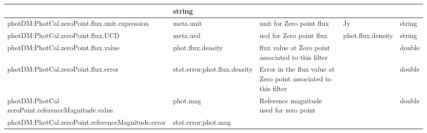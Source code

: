 \documentclass[11pt,a4paper]{ivoa}
\begin{document}
\begin{appendices}
\begin{table}[H]
\begin{adjustbox}{angle=90}
\begin{tabular}{p{3in}p{0.87in}p{2in}p{1in}p{0.25in}}
\multicolumn{1}{p{1in}}{} &
\multicolumn{1}{p{0.25in}}{{\fontsize{8pt}{8pt}\selectfont string}} \\
\hline
\multicolumn{1}{p{3in}}{{\fontsize{8pt}{8pt}
\selectfont photDM:PhotCal.zeroPoint.flux.unit.expression}} &
\multicolumn{1}{p{0.87in}}{{\fontsize{8pt}{8pt}\selectfont meta.unit }} &
\multicolumn{1}{p{2in}}{{\fontsize{8pt}{8pt}\selectfont unit for Zero point flux}} &
\multicolumn{1}{p{1in}}{{\fontsize{8pt}{8pt}\selectfont Jy}} &
\multicolumn{1}{p{0.25in}}{{\fontsize{8pt}{8pt}\selectfont string}} \\
\hline
\multicolumn{1}{p{3in}}{{\fontsize{8pt}{8pt}\selectfont photDM:PhotCal.zeroPoint.flux.UCD}} &
\multicolumn{1}{p{0.87in}}{{\fontsize{8pt}{8pt}\selectfont meta.ucd }} &
\multicolumn{1}{p{2in}}{{\fontsize{8pt}{8pt}\selectfont ucd for Zero point flux}} &
\multicolumn{1}{p{1in}}{{\fontsize{8pt}{8pt}\selectfont phot.flux.density}} &
\multicolumn{1}{p{0.25in}}{{\fontsize{8pt}{8pt}\selectfont string}} \\
\hline
\multicolumn{1}{p{3in}}{{\fontsize{8pt}{8pt}\selectfont photDM:PhotCal.zeroPoint.flux.value}} &
\multicolumn{1}{p{0.87in}}{{\fontsize{8pt}{8pt}\selectfont phot.flux.density }} &
\multicolumn{1}{p{2in}}{{\fontsize{8pt}{8pt}\selectfont flux value at Zero point associated 
to this filter}} &
\multicolumn{1}{p{1in}}{} &
\multicolumn{1}{p{0.25in}}{{\fontsize{8pt}{8pt}\selectfont double}} \\
\hline
\multicolumn{1}{p{3in}}{{\fontsize{8pt}{8pt}\selectfont photDM:PhotCal.zeroPoint.flux.error}} &
\multicolumn{1}{p{0.87in}}{{\fontsize{8pt}{8pt}\selectfont stat.error;phot.flux.density}} &
\multicolumn{1}{p{2in}}{{\fontsize{8pt}{8pt}\selectfont Error in the flux value at Zero point 
associated to this filter}} &
\multicolumn{1}{p{1in}}{} &
\multicolumn{1}{p{0.25in}}{{\fontsize{8pt}{8pt}\selectfont double}} \\
\hline
\multicolumn{1}{p{3in}}{{\fontsize{8pt}{8pt}
\selectfont photDM:PhotCal zeroPoint.referenceMagnitude.value}} &
\multicolumn{1}{p{0.87in}}{{\fontsize{8pt}{8pt}\selectfont phot.mag}} &
\multicolumn{1}{p{2in}}{{\fontsize{8pt}{8pt}\selectfont Reference magnitude used for zero point}} &
\multicolumn{1}{p{1in}}{{\fontsize{8pt}{8pt}\selectfont 0.0}} &
\multicolumn{1}{p{0.25in}}{{\fontsize{8pt}{8pt}\selectfont double} \par } \\
\hline
\multicolumn{1}{p{3in}}{{\fontsize{8pt}{8pt}
\selectfont photDM:PhotCal.zeroPoint.referenceMagnitude.error}} &
\multicolumn{1}{p{0.87in}}{{\fontsize{8pt}{8pt}\selectfont stat.error;phot.mag}} &


\end{tabular}
\end{adjustbox}
\end{table}
\end{appendices}
\end{document}
